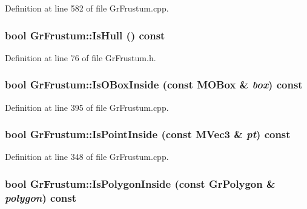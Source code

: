 \begin{CompactItemize}
Definition at line 582 of file GrFrustum.cpp.\hypertarget{class_gr_frustum_6bc615f0766acce17756f75c5c026318}{
\subsubsection[{IsHull}]{\setlength{\rightskip}{0pt plus 5cm}bool GrFrustum::IsHull () const}}
\label{class_gr_frustum_6bc615f0766acce17756f75c5c026318}




Definition at line 76 of file GrFrustum.h.\hypertarget{class_gr_frustum_3bb369beaea81bc56884ca295d95f0e7}{
\subsubsection[{IsOBoxInside}]{\setlength{\rightskip}{0pt plus 5cm}bool GrFrustum::IsOBoxInside (const {\bf MOBox} \& {\em box}) const}}
\label{class_gr_frustum_3bb369beaea81bc56884ca295d95f0e7}




Definition at line 395 of file GrFrustum.cpp.\hypertarget{class_gr_frustum_551cfdc1d421a551b99caadc765b6bb4}{
\subsubsection[{IsPointInside}]{\setlength{\rightskip}{0pt plus 5cm}bool GrFrustum::IsPointInside (const {\bf MVec3} \& {\em pt}) const}}
\label{class_gr_frustum_551cfdc1d421a551b99caadc765b6bb4}




Definition at line 348 of file GrFrustum.cpp.\hypertarget{class_gr_frustum_b48fd10eabe661c8d28e6ea55f143da5}{
\subsubsection[{IsPolygonInside}]{\setlength{\rightskip}{0pt plus 5cm}bool GrFrustum::IsPolygonInside (const {\bf GrPolygon} \& {\em polygon}) const}}
\label{class_gr_frustum_b48fd10eabe661c8d28e6ea55f143da5}





\end{CompactItemize}
